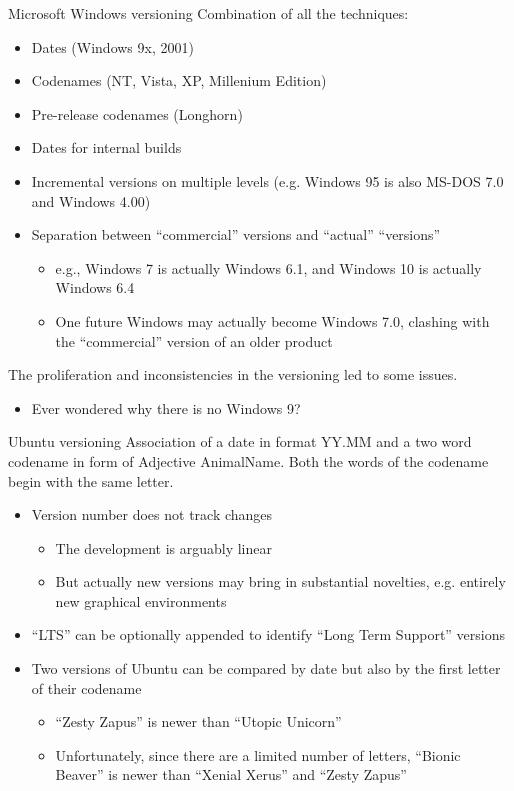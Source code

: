 \documentclass[presentation]{beamer}
\begin{document}
\begin{frame}{Microsoft Windows versioning}
    Combination of all the techniques:
    \begin{itemize}
        \item Dates (Windows 9x, 2001)
        \item Codenames (NT, Vista, XP, Millenium Edition)
        \item Pre-release codenames (Longhorn)
        \item Dates for internal builds
        \item Incremental versions on multiple levels (e.g. Windows 95 is also MS-DOS 7.0 and Windows 4.00)
        \item Separation between ``commercial'' versions and ``actual'' ``versions''
        \begin{itemize}
            \item e.g., Windows 7 is actually Windows 6.1, and Windows 10 is actually Windows 6.4
            \item One future Windows may actually become Windows 7.0, clashing with the ``commercial'' version of an older product
        \end{itemize}
    \end{itemize}
    The proliferation and inconsistencies in the versioning led to some issues.
    \begin{itemize}
        \item Ever wondered why there is no Windows 9?
    \end{itemize}
\end{frame}

\begin{frame}{Ubuntu versioning}
    Association of a date in format YY.MM and a two word codename in form of Adjective AnimalName. Both the words of the codename begin with the same letter.
    \begin{itemize}
        \item Version number does not track changes
        \begin{itemize}
            \item The development is arguably linear
            \item But actually new versions may bring in substantial novelties, e.g. entirely new graphical environments
        \end{itemize}
        \item ``LTS'' can be optionally appended to identify ``Long Term Support'' versions
        \item Two versions of Ubuntu can be compared by date but also by the first letter of their codename
        \begin{itemize}
            \item ``Zesty Zapus'' is newer than ``Utopic Unicorn''
            \item Unfortunately, since there are a limited number of letters, ``Bionic Beaver'' is newer than ``Xenial Xerus'' and ``Zesty Zapus''
        \end{itemize}
    \end{itemize}
\end{frame}
\end{document}
